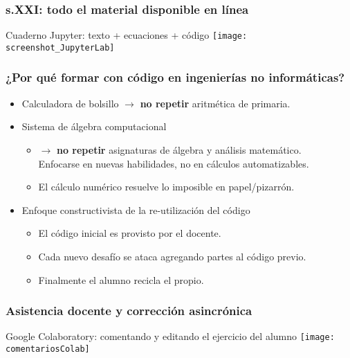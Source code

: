 \documentclass[aspectratio=43]{beamer}
\begin{document}
\begin{frame}
	\frametitle{s.XXI: todo el material disponible en línea}
	\pause
	\begin{block}{Cuaderno Jupyter: texto + ecuaciones + código}
		\texttt{[image: screenshot\_JupyterLab]}
	\end{block}
\end{frame}


\begin{frame}
	\frametitle{¿Por qué formar con código en ingenierías no informáticas?}
	\pause
	\begin{block}{}
		\begin{itemize}[<+->]
			\item Calculadora de bolsillo \(\rightarrow\) \textbf{no repetir} aritmética de primaria.
			\item Sistema de álgebra computacional 
			\begin{itemize}[<+->]
				\item \(\rightarrow\) \textbf{no repetir} asignaturas de álgebra y análisis matemático.\\
				Enfocarse en nuevas habilidades, no en cálculos automatizables.
				\item El cálculo numérico resuelve lo imposible en papel/pizarrón.
			\end{itemize}
			\item Enfoque constructivista de la re-utilización del código
			\begin{itemize}[<+->]
				\item El código inicial es provisto por el docente.
				\item Cada nuevo desafío se ataca agregando partes al código previo.
				\item Finalmente el alumno recicla el propio.
			\end{itemize}
		\end{itemize}
	\end{block}
\end{frame}


\begin{frame}
	\frametitle{Asistencia docente y corrección asincrónica}
	\begin{block}{Google Colaboratory: comentando y editando el ejercicio del alumno}
		\texttt{[image: comentariosColab]}
	\end{block}
\end{frame}
\end{document}
